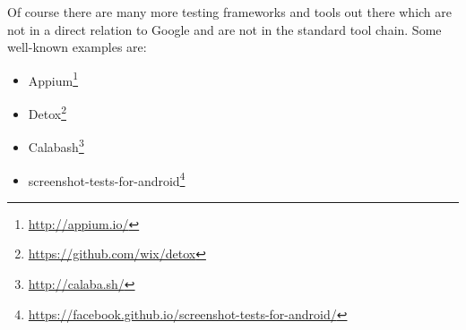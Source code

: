 Of course there are many more testing frameworks and tools out there which are not in a direct relation to Google and are not in the standard tool chain. Some well-known examples are:

\begin{itemize}
	\item Appium\footnote{\url{http://appium.io/}}
	\item Detox\footnote{\url{https://github.com/wix/detox}}
	\item Calabash\footnote{\url{http://calaba.sh/}}
	\item screenshot-tests-for-android\footnote{\url{https://facebook.github.io/screenshot-tests-for-android/}}
\end{itemize}



